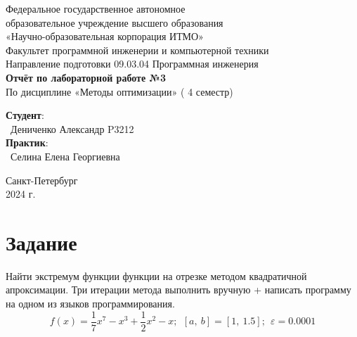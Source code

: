 \documentclass{article}
\begin{document}
\begin{center}
    \Large
    Федеральное государственное автономное \\
    образовательное учреждение высшего образования \\ 
    «Научно-образовательная корпорация ИТМО»\\
    \vspace{0.5cm}
    \large
    Факультет программной инженерии и компьютерной техники \\
    Направление подготовки 09.03.04 Программная инженерия \\
    \vspace{1cm}
    \Large
    \textbf{Отчёт по лабораторной работе №3} \\
    По дисциплине «Методы оптимизации» ( 4 семестр)\\
    \large
    \vspace{8cm}

    \begin{minipage}{.33\textwidth}
    \end{minipage}
    \hfill
    \begin{minipage}{.4\textwidth}
    
        \textbf{Студент}: \vspace{.1cm} \\
        \ Дениченко Александр P3212\\
        \textbf{Практик}:  \\
        \ Селина Елена Георгиевна
    \end{minipage}
    \vfill
Санкт-Петербург\\ 2024 г.
\end{center}
\pagestyle{empty}
\newpage
\pagestyle{plain}

\section*{Задание}
Найти экстремум функции функции на отрезке методом квадратичной апроксимации. Три итерации метода выполнить вручную + написать программу на одном из языков программирования.
\[f(x) = \frac{1}{7}x^7 - x^3+\frac{1}{2}x^2-x;\ \ [a,\ b] = [1,\ 1.5]; \ \ \varepsilon=0.0001\]
\end{document}
